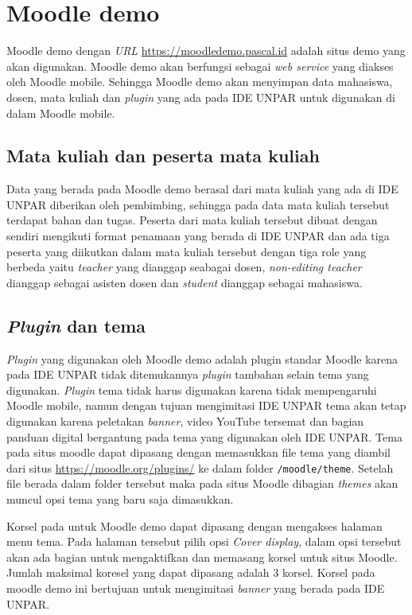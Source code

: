 \section{Moodle demo}

Moodle demo dengan \textit{URL} \url{https://moodledemo.pascal.id} adalah situs demo yang akan digunakan. Moodle demo akan berfungsi sebagai \textit{web service} yang diakses oleh Moodle mobile. Sehingga Moodle demo akan menyimpan data mahasiswa, dosen, mata kuliah dan \textit{plugin} yang  ada pada IDE UNPAR untuk digunakan di dalam Moodle mobile. 
\subsection{Mata kuliah dan peserta mata kuliah}

Data yang berada pada Moodle demo berasal dari mata kuliah yang ada di IDE UNPAR diberikan oleh pembimbing, sehingga pada data mata kuliah tersebut terdapat bahan dan tugas. Peserta dari mata kuliah tersebut dibuat dengan sendiri mengikuti format penamaan yang berada di IDE UNPAR dan ada tiga peserta yang diikutkan dalam mata kuliah tersebut dengan tiga role yang berbeda yaitu \textit{teacher} yang dianggap seabagai dosen, \textit{non-editing teacher} dianggap sebagai asisten dosen dan \textit{student} dianggap sebagai mahasiswa.

\subsection{\textit{Plugin} dan tema}

\textit{Plugin} yang digunakan oleh Moodle demo adalah plugin standar Moodle karena pada IDE UNPAR tidak ditemukannya \textit{plugin} tambahan selain tema yang digunakan. \textit{Plugin} tema tidak harus digunakan karena tidak mempengaruhi Moodle mobile, namun dengan tujuan mengimitasi IDE UNPAR tema akan tetap digunakan karena peletakan \textit{banner}, video YouTube tersemat dan bagian panduan digital bergantung pada tema yang digunakan oleh IDE UNPAR. Tema pada situs moodle dapat dipasang dengan memasukkan file tema yang diambil dari situs \url{https://moodle.org/plugins/} ke dalam folder \texttt{/moodle/theme}. Setelah file berada dalam folder tersebut maka pada situs Moodle dibagian \textit{themes} akan muncul opsi tema yang baru saja dimasukkan.

Korsel pada untuk Moodle demo dapat dipasang dengan mengakses halaman menu tema. Pada halaman tersebut pilih opsi \textit{Cover display}, dalam opsi tersebut akan ada bagian untuk mengaktifkan dan memasang korsel untuk situs Moodle. Jumlah maksimal koresel yang dapat dipasang adalah 3 korsel. Korsel pada moodle demo ini bertujuan untuk mengimitasi \textit{banner} yang berada pada IDE UNPAR.

